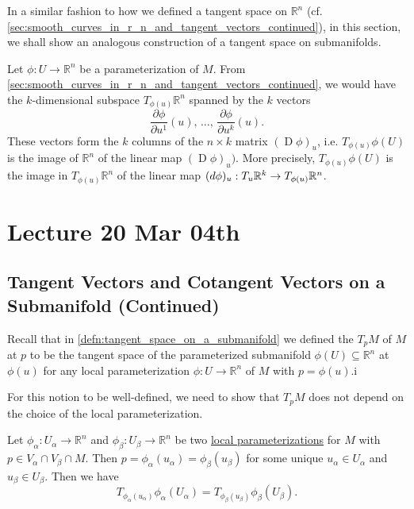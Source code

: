 \documentclass[notoc,notitlepage]{tufte-book}
\DeclareMathOperator{\D}{D}
\begin{document}
In a similar fashion to how we defined a tangent space on $\mathbb{R}^n$ (cf.
\cref{sec:smooth_curves_in_r_n_and_tangent_vectors_continued}), in
this section, we shall show an analogous construction of a tangent space on
submanifolds.

Let $\phi : U \to \mathbb{R}^n$ be a parameterization of $M$. From
\cref{sec:smooth_curves_in_r_n_and_tangent_vectors_continued}, we would have the
$k$-dimensional subspace $T_{\phi(u)} \mathbb{R}^n$ spanned by the $k$ vectors
\begin{equation*}
  \frac{\partial \phi}{\partial u^1} (u), \, \hdots, \, \frac{\partial
  \phi}{\partial u^k} (u).
\end{equation*}
These vectors form the $k$ columns of the $n \times k$ matrix $(\D \phi)_u$,
i.e. $T_{\phi(u)} \phi(U)$ is the image of $\mathbb{R}^n$ of the linear map $(\D
\phi)_u)$. More precisely, $T_{\phi(u)} \phi(U)$ is the image in $T_{\phi(u)}
\mathbb{R}^n$ of the linear map $(\mathop{}\!d{\phi})_u : T_u \mathbb{R}^k \to
T_{\phi(u)} \mathbb{R}^n$.



\chapter{Lecture 20 Mar 04th}%
\label{chp:lecture_20_mar_04th}

\section{Tangent Vectors and Cotangent Vectors on a Submanifold (Continued)}%
\label{sec:tangent_vectors_and_cotangent_vectors_on_a_submanifold_continued}

Recall that in \cref{defn:tangent_space_on_a_submanifold} we defined the
 $T_p M$ of $M$ at $p$ to be the tangent space of the
parameterized submanifold $\phi(U) \subseteq \mathbb{R}^n$ at $\phi(u)$ for any
local parameterization $\phi : U \to \mathbb{R}^n$ of $M$ with $p = \phi(u)$.i

For this notion to be well-defined, we need to show that $T_p M$ does not depend
on the choice of the local parameterization.

\begin{propo}\label{propo:well_definedness_of_the_tangent_space_of_a_submanifold}
  Let $\phi_\alpha : U_\alpha \to \mathbb{R}^n$ and $\phi_\beta : U_\beta \to
  \mathbb{R}^n$ be two \hyperref[defn:local_parameterizations]{local
  parameterizations} for $M$ with $p \in V_\alpha \cap V_\beta \cap M$. Then $p =
  \phi_\alpha (u_\alpha) = \phi_\beta(u_\beta)$ for some unique $u_\alpha \in
  U_\alpha$ and $u_\beta \in U_\beta$. Then we have
  \begin{equation*}
    T_{\phi_{\alpha} (u_\alpha) } \phi_\alpha (U_\alpha) = T_{\phi_\beta(u_\beta)}
    \phi_\beta (U_\beta).
  \end{equation*}
\end{propo}
\end{document}
